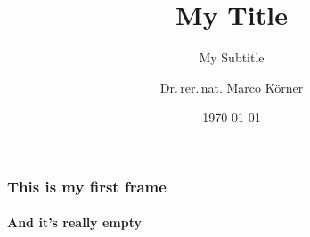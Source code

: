 \documentclass[%
  aspectratio=169,
  9pt,
  USenglish,
  titlegraphic,
  handout,
]{beamer}
\title{My Title}
\subtitle{My Subtitle}
\author{Dr{.}\,rer{.}\,nat{.} Marco Körner}
\institute[TUM]{Technical University of Munich, Germany\\
                Remote Sensing Technology}
\date{\today}
\begin{document}
\begin{frame}[t]
  \titlepage
\end{frame}

\begin{frame}
  \frametitle{This is my first frame}
  \framesubtitle{And it's really empty}
\end{frame}
\end{document}
